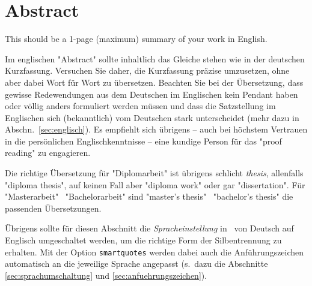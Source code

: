 \chapter{Abstract}

\begin{english} %
This should be a 1-page (maximum) summary of your work in English.
\end{english}

Im englischen "Abstract" sollte inhaltlich das Gleiche stehen wie in der
deutschen Kurzfassung. Versuchen Sie daher, die Kurzfassung prä\-zise
umzusetzen, ohne aber dabei Wort für Wort zu übersetzen. Beachten Sie bei der
Übersetzung, dass gewisse Redewendungen aus dem Deutschen im Englischen kein
Pendant haben oder völlig anders formuliert werden müssen und dass die
Satzstellung im Englischen sich (bekanntlich) vom Deutschen stark unterscheidet
(mehr dazu in Abschn.\ \ref{sec:englisch}). Es empfiehlt sich übrigens --
auch bei höchstem Vertrauen in die persönlichen Englischkenntnisse -- eine
kundige Person für das "proof reading" zu engagieren.

Die richtige Übersetzung für "Diplomarbeit" ist übrigens schlicht
\emph{thesis}, allenfalls "diploma thesis", auf keinen Fall aber "diploma
work" oder gar "dissertation". Für "Masterarbeit" \bzw\ "Bachelorarbeit" sind
"master's thesis" \bzw\ "bachelor's thesis" die passenden Übersetzungen.

Übrigens sollte für diesen Abschnitt die \emph{Spracheinstellung} in \latex\
von Deutsch auf Englisch umgeschaltet werden, um die richtige Form der
Silbentrennung zu erhalten. Mit der Option \texttt{smartquotes} werden dabei
auch die Anführungszeichen automatisch an die jeweilige Sprache angepasst
(s.\ dazu die Abschnitte \ref{sec:sprachumschaltung} und
\ref{sec:anfuehrungszeichen}).
